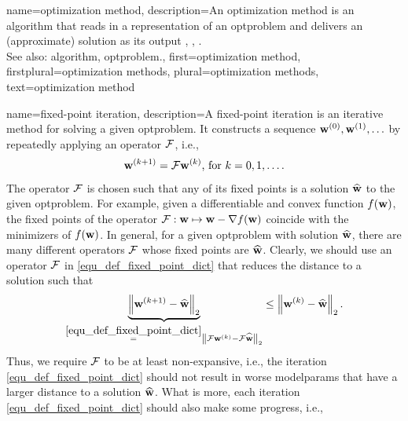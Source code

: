 {name={optimization method},
	description={An optimization method is an \gls{algorithm} that 
		reads in a representation of an \gls{optproblem} and delivers an (approximate) solution 
		as its output \cite{BoydConvexBook}, \cite{BertsekasNonLinProgr}, \cite{nesterov04}.
		 \\
		 See also: \gls{algorithm}, \gls{optproblem}.},
	first={optimization method},
	firstplural={optimization methods}, 
	plural={optimization methods}, 
	text={optimization method}
}

{name={fixed-point iteration},
	description={A fixed-point iteration is an iterative method for solving 
		a given \gls{optproblem}. It constructs a sequence ${\bf w}^{(0)}, {\bf w}^{(1)}, \ldots$ by 
		 repeatedly applying an operator $\mathcal{F}$, i.e., 
		 \begin{equation} 
		 	\label{equ_def_fixed_point_dict} 
		 	{\bf w}^{(k+1)} = \mathcal{F} {\bf w}^{(k)} \mbox{, for } k=0, 1, \ldots.
		 \end{equation} 
		 The operator $\mathcal{F}$ is chosen such that any of its fixed points is a solution 
		 $\widehat{{\bf w}}$ to the given \gls{optproblem}. For example, given a \gls{differentiable} and 
		 \gls{convex} \gls{function} $f({\bf w})$, the fixed points of the operator $\mathcal{F}: {\bf w} \mapsto {\bf w} - \nabla f({\bf w})$ 
		 coincide with the minimizers of $f({\bf w})$. In general, for a given \gls{optproblem} with solution $\widehat{{\bf w}}$, 
		 there are many different operators $\mathcal{F}$ whose fixed points are $\widehat{{\bf w}}$. 
		 Clearly, we should use an operator $\mathcal{F}$ in \eqref{equ_def_fixed_point_dict} that reduces the distance to a solution such that
		 \begin{equation} 
			\nonumber
			\underbrace{\left\Vert { {\bf w}^{(k+1)} - \widehat{\mathbf{w}}} \right\Vert_{2}}_{\stackrel{\eqref{equ_def_fixed_point_dict}}{=} \left\Vert { \mathcal{F}{\bf w}^{(k)} - \mathcal{F}\widehat{{\bf w}}} \right\Vert_{2}}  \leq 	\left\Vert { {\bf w}^{(k)} - \widehat{{\bf w}}} \right\Vert_{2}. 
		\end{equation}
		Thus, we require $\mathcal{F}$ to be at least non-expansive, i.e., the iteration \eqref{equ_def_fixed_point_dict} 
		should not result in worse \gls{modelparams} that have a larger distance to a solution $\widehat{{\bf w}}$. 
		What is more, each iteration \eqref{equ_def_fixed_point_dict} should also make some progress, i.e., 
}}
